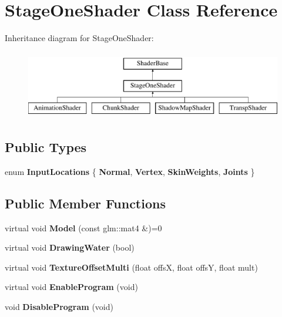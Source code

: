 \hypertarget{classStageOneShader}{\section{\-Stage\-One\-Shader \-Class \-Reference}
\label{classStageOneShader}
}
\-Inheritance diagram for \-Stage\-One\-Shader\-:\begin{figure}[H]
\begin{center}
\leavevmode
\includegraphics[height=3.000000cm]{classStageOneShader}
\end{center}
\end{figure}
\subsection*{\-Public \-Types}
\begin{DoxyCompactItemize}
\item 
enum {\bfseries \-Input\-Locations} \{ {\bfseries \-Normal}, 
{\bfseries \-Vertex}, 
{\bfseries \-Skin\-Weights}, 
{\bfseries \-Joints}
 \}
\end{DoxyCompactItemize}
\subsection*{\-Public \-Member \-Functions}
\begin{DoxyCompactItemize}
\item 
\hypertarget{classStageOneShader_ad4e7930febdc8bd6274232cca0203f12}{virtual void {\bfseries \-Model} (const glm\-::mat4 \&)=0}\label{classStageOneShader_ad4e7930febdc8bd6274232cca0203f12}

\item 
\hypertarget{classStageOneShader_a500639ba8a97e46d6b1b5f2b5815a239}{virtual void {\bfseries \-Drawing\-Water} (bool)}\label{classStageOneShader_a500639ba8a97e46d6b1b5f2b5815a239}

\item 
\hypertarget{classStageOneShader_ae53cd72ba6f7bd1db7daeec14c01ec1d}{virtual void {\bfseries \-Texture\-Offset\-Multi} (float offs\-X, float offs\-Y, float mult)}\label{classStageOneShader_ae53cd72ba6f7bd1db7daeec14c01ec1d}

\item 
\hypertarget{classStageOneShader_a3e4c603995edf86b5d4c0985bebfcb03}{virtual void {\bfseries \-Enable\-Program} (void)}\label{classStageOneShader_a3e4c603995edf86b5d4c0985bebfcb03}

\item 
\hypertarget{classStageOneShader_a722e5537b67ddb180e6e063992b78952}{void {\bfseries \-Disable\-Program} (void)}\label{classStageOneShader_a722e5537b67ddb180e6e063992b78952}

\end{DoxyCompactItemize}
